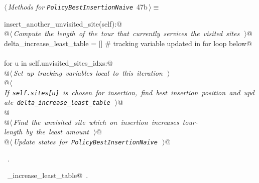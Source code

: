 \documentclass[11.5pt]{report}
\begin{document}
\vspace{-0.8cm}\newchunk 
\begin{flushleft} \small\label{scrap68}\raggedright\small
{} $\langle\,${\itshape Methods for \verb|PolicyBestInsertionNaive|}\nobreak\ {\footnotesize {47b}}$\,\rangle\equiv$
\vspace{-1ex}
\begin{list}{}{} \item
\mbox{}\verb@def insert_another_unvisited_site(self):@\\
\mbox{}\verb@   @\hbox{$\langle\,${\itshape Compute the length of the tour that currently services the visited sites}\nobreak\ {\footnotesize {}}$\,\rangle$}\verb@    @\\
\mbox{}\verb@   delta_increase_least_table = [] # tracking variable updated in for loop below@\\
\mbox{}\verb@@\\
\mbox{}\verb@   for u in self.unvisited_sites_idxs:@\\
\mbox{}\verb@      @\hbox{$\langle\,${\itshape Set up tracking variables local to this iteration}\nobreak\ {\footnotesize {}}$\,\rangle$}\verb@@\\
\mbox{}\verb@      @\hbox{$\langle\,${\itshape If \texttt{self.sites[u]} is chosen for insertion, find best insertion position and update \texttt{delta\_increase\_least\_table}}\nobreak\ {\footnotesize {}}$\,\rangle$}\verb@  @\\
\mbox{}\verb@                 @\\
\mbox{}\verb@   @\hbox{$\langle\,${\itshape Find the unvisited site which on insertion increases tour-length by the least amount}\nobreak\ {\footnotesize {}}$\,\rangle$}\verb@     @\\
\mbox{}\verb@   @\hbox{$\langle\,${\itshape Update states for \texttt{PolicyBestInsertionNaive}}\nobreak\ {\footnotesize {}}$\,\rangle$}\verb@ @\\
\mbox{}\verb@@{\NWsep}
\end{list}
\vspace{-1.5ex}
\footnotesize
\begin{list}{}{\setlength{\itemsep}{-\parsep}\setlength{\itemindent}{-\leftmargin}}
\item \NWtxtMacroRefIn\ .
\item \NWtxtIdentsDefed\nobreak\  \verb@delta_increase_least_table@\nobreak\ .
\item{}
\end{list}
\vspace{4ex}
\end{flushleft}
\end{document}
